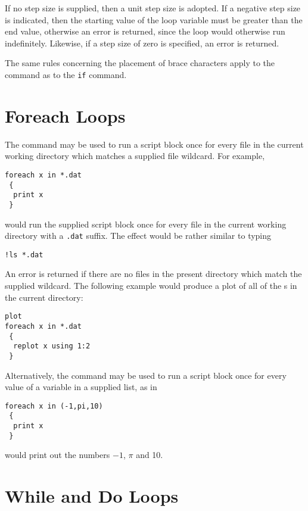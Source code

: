 If no step size is supplied, then a unit step size is adopted. If a negative
step size is indicated, then the starting value of the loop variable must be
greater than the end value, otherwise an error is returned, since the loop
would otherwise run indefinitely. Likewise, if a step size of zero is
specified, an error is returned.

The same rules concerning the placement of brace characters apply to the
 command as to the {\tt if} command.

\section{Foreach Loops}

The  command may be used to run a script block once for every
file in the current working directory which matches a supplied file wildcard.
For example,

\begin{verbatim}
foreach x in *.dat
 {
  print x
 }
\end{verbatim}

\noindent would run the supplied script block once for every file in the
current working directory with a {\tt .dat} suffix. The effect would be rather
similar to typing

\begin{verbatim}
!ls *.dat
\end{verbatim}

An error is returned if there are no files in the present directory which match
the supplied wildcard. The following example would produce a plot of all of the
\datafile s in the current directory:

\begin{verbatim}
plot
foreach x in *.dat
 {
  replot x using 1:2
 }
\end{verbatim}

Alternatively, the  command may be used to run a script block
once for every value of a variable in a supplied list, as in

\begin{verbatim}
foreach x in (-1,pi,10)
 {
  print x
 }
\end{verbatim}

\noindent would print out the numbers $-1$, $\pi$ and 10.

\section{While and Do Loops}

